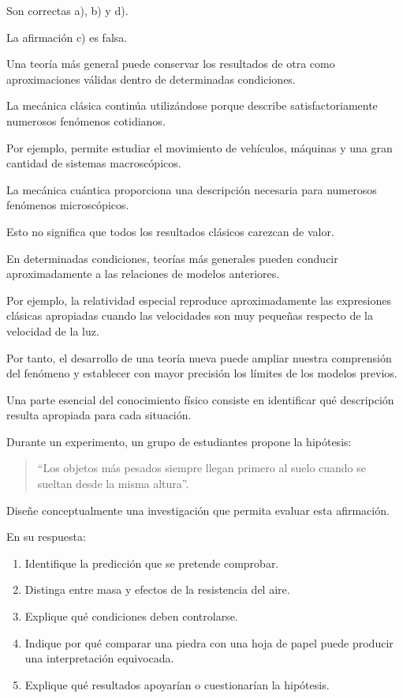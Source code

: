 \begin{respuesta}
Son correctas a), b) y d).

La afirmación c) es falsa.

Una teoría más general puede conservar los resultados de otra como aproximaciones válidas dentro de determinadas condiciones.
\end{respuesta}

\begin{explicacion}
La mecánica clásica continúa utilizándose porque describe satisfactoriamente numerosos fenómenos cotidianos.

Por ejemplo, permite estudiar el movimiento de vehículos, máquinas y una gran cantidad de sistemas macroscópicos.

La mecánica cuántica proporciona una descripción necesaria para numerosos fenómenos microscópicos.

Esto no significa que todos los resultados clásicos carezcan de valor.

En determinadas condiciones, teorías más generales pueden conducir aproximadamente a las relaciones de modelos anteriores.

Por ejemplo, la relatividad especial reproduce aproximadamente las expresiones clásicas apropiadas cuando las velocidades son muy pequeñas respecto de la velocidad de la luz.

Por tanto, el desarrollo de una teoría nueva puede ampliar nuestra comprensión del fenómeno y establecer con mayor precisión los límites de los modelos previos.

Una parte esencial del conocimiento físico consiste en identificar qué descripción resulta apropiada para cada situación.
\end{explicacion}


\nivelavanzado

\begin{ejercicio}
Durante un experimento, un grupo de estudiantes propone la hipótesis:

\begin{quote}
``Los objetos más pesados siempre llegan primero al suelo cuando se sueltan desde la misma altura''.
\end{quote}

Diseñe conceptualmente una investigación que permita evaluar esta afirmación.

En su respuesta:

\begin{enumerate}[label=\alph*)]
    \item Identifique la predicción que se pretende comprobar.
    \item Distinga entre masa y efectos de la resistencia del aire.
    \item Explique qué condiciones deben controlarse.
    \item Indique por qué comparar una piedra con una hoja de papel puede producir una interpretación equivocada.
    \item Explique qué resultados apoyarían o cuestionarían la hipótesis.
\end{enumerate}
\end{ejercicio}

